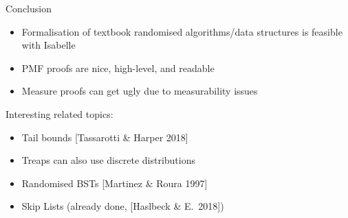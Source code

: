 \documentclass[%
	sans,
	12pt,
]{beamer}
\begin{document}
\begin{frame}{Conclusion}
\begin{itemize}
\item Formalisation of textbook randomised algorithms/data structures is feasible with Isabelle\pause
\item PMF proofs are nice, high-level, and readable\pause
\item Measure proofs can get ugly due to measurability issues\pause
\end{itemize}
Interesting related topics:\pause
\begin{itemize}
\item Tail bounds [Tassarotti \& Harper 2018]\pause
\item Treaps can also use discrete distributions\pause
\item Randomised BSTs [Martinez \& Roura 1997]\pause
\item Skip Lists (already done, [Haslbeck \& E.\ 2018])
\end{itemize}
\end{frame}
\end{document}
